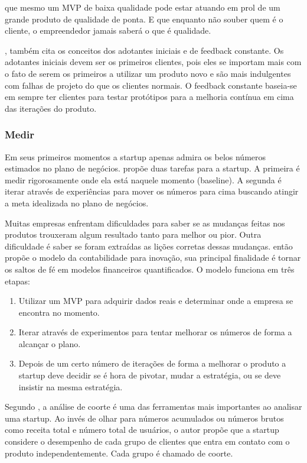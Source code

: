 que mesmo um MVP de baixa qualidade pode estar atuando em prol de um grande produto de qualidade de ponta. E que enquanto não souber quem é o cliente, o empreendedor jamais saberá o que é qualidade. \cite{leanstartup}

, também cita os conceitos dos adotantes iniciais e de feedback constante. Os adotantes iniciais devem ser os primeiros clientes, pois eles se importam mais com o fato de serem os primeiros a utilizar um produto novo e são mais indulgentes com falhas de projeto do que os clientes normais. O feedback constante baseia-se em sempre ter clientes para testar protótipos para a melhoria contínua em cima das iterações do produto.

\subsubsection{Medir}
\label{cha:medir}

Em seus primeiros momentos a startup apenas admira os belos números estimados no plano de negócios.  propõe duas tarefas para a startup. A primeira é medir rigorosamente onde ela está naquele momento (baseline). A segunda é iterar através de experiências para mover os números para cima buscando atingir a meta idealizada no plano de negócios.

Muitas empresas enfrentam dificuldades para saber se as mudanças feitas nos produtos trouxeram algum resultado tanto para melhor ou pior. Outra dificuldade é saber se foram extraídas as lições corretas dessas mudanças.  então propõe o modelo da contabilidade para inovação, sua principal finalidade é tornar os saltos de fé em modelos financeiros quantificados. O modelo funciona em três etapas:
\begin{enumerate}
\item Utilizar um MVP para adquirir dados reais e determinar onde a empresa se encontra no momento.
\item Iterar através de experimentos para tentar melhorar os números de forma a alcançar o plano.
\item Depois de um certo número de iterações de forma a melhorar o produto a startup deve decidir se é hora de pivotar, mudar a estratégia, ou se deve insistir na mesma estratégia.
\end{enumerate}

Segundo , a análise de coorte é uma das ferramentas mais importantes ao analisar uma startup. Ao invés de olhar para números acumulados ou números brutos como receita total e número total de usuários, o autor propõe que a startup considere o desempenho de cada grupo de clientes que entra em contato com o produto independentemente. Cada grupo é chamado de coorte.

